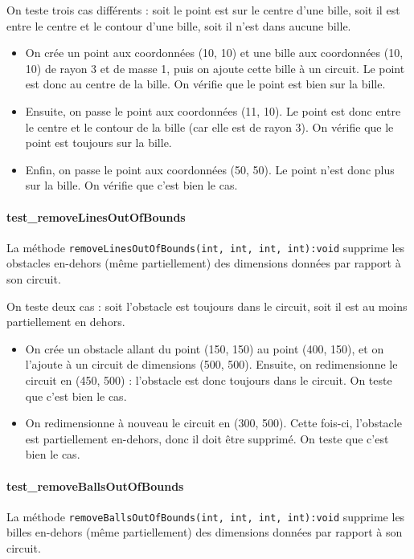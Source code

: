 \documentclass{report}
\begin{document}
On teste trois cas différents : soit le point est sur le centre d’une bille, soit il est entre le centre et le contour d’une bille, soit il n’est dans aucune bille.

\begin{itemize}
\item On crée un point aux coordonnées (10, 10) et une bille aux coordonnées (10, 10) de rayon 3 et de masse 1, puis on ajoute cette bille à un circuit. Le point est donc au centre de la bille. On vérifie que le point est bien sur la bille.
\item Ensuite, on passe le point aux coordonnées (11, 10). Le point est donc entre le centre et le contour de la bille (car elle est de rayon 3). On vérifie que le point est toujours sur la bille.
\item Enfin, on passe le point aux coordonnées (50, 50). Le point n’est donc plus sur la bille. On vérifie que c’est bien le cas.
\end{itemize}

\paragraph{test\_removeLinesOutOfBounds}

La méthode \texttt{removeLinesOutOfBounds(int, int, int, int):void} supprime les obstacles en-dehors (même partiellement) des dimensions données par rapport à son circuit.

On teste deux cas : soit l’obstacle est toujours dans le circuit, soit il est au moins partiellement en dehors.

\begin{itemize}
\item On crée un obstacle allant du point (150, 150) au point (400, 150), et on l’ajoute à un circuit de dimensions (500, 500). Ensuite, on redimensionne le circuit en (450, 500) : l’obstacle est donc toujours dans le circuit. On teste que c’est bien le cas.
\item On redimensionne à nouveau le circuit en (300, 500). Cette fois-ci, l’obstacle est partiellement en-dehors, donc il doit être supprimé. On teste que c’est bien le cas.
\end{itemize}

\paragraph{test\_removeBallsOutOfBounds}

La méthode \texttt{removeBallsOutOfBounds(int, int, int, int):void} supprime les billes en-dehors (même partiellement) des dimensions données par rapport à son circuit.
\end{document}
